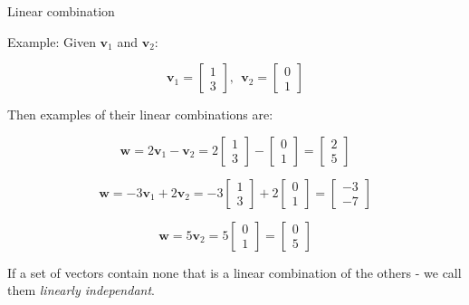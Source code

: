 \documentclass{beamer}
\begin{document}
\begin{frame}{Linear combination}
	\begin{flushleft}
		
		Example: Given $\mathbf v_1$ and $\mathbf v_2$:
		
		\begin{equation}
			\mathbf v_1 = 
			\begin{bmatrix} 
				1 \\ 3
			\end{bmatrix}, \ \ 
			\mathbf v_2 = 
			\begin{bmatrix} 
				0 \\ 1
			\end{bmatrix}
		\end{equation}
		
		Then examples of their linear combinations are:
		
		\begin{equation}
			\mathbf w = 2 \mathbf v_1 - \mathbf v_2 = 
			2
			\begin{bmatrix} 
				1 \\ 3
			\end{bmatrix}
			-
			\begin{bmatrix} 
				0 \\ 1
			\end{bmatrix}
			=
			\begin{bmatrix} 
				2 \\ 5
			\end{bmatrix}
		\end{equation}
		
		\begin{equation}
			\mathbf w = - 3\mathbf v_1 + 2\mathbf v_2 = 
			-3
			\begin{bmatrix} 
				1 \\ 3
			\end{bmatrix}
			+2
			\begin{bmatrix} 
				0 \\ 1
			\end{bmatrix}
			=
			\begin{bmatrix} 
				-3 \\ -7
			\end{bmatrix}
		\end{equation}
		
		
		\begin{equation}
			\mathbf w = 5\mathbf v_2 = 
			5
			\begin{bmatrix} 
				0 \\ 1
			\end{bmatrix}
			=
			\begin{bmatrix} 
				0 \\ 5
			\end{bmatrix}
		\end{equation}
		
		If a set of vectors contain none that is a linear combination of the others - we call them \textit{linearly independant}.	
		
	\end{flushleft}
\end{frame}
\end{document}
